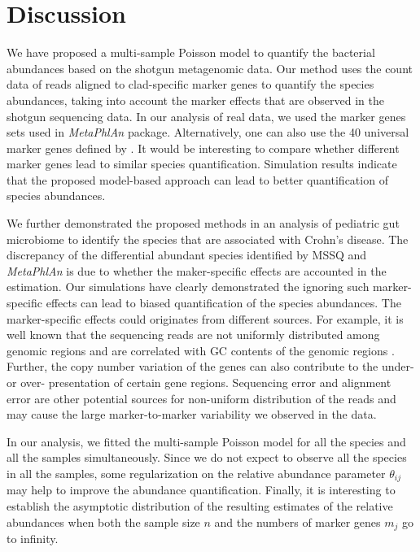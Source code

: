 \section{Discussion}
We have proposed a multi-sample Poisson model to quantify the bacterial abundances based on the shotgun metagenomic data.  Our method uses the count data of reads  aligned to clad-specific  marker genes  to quantify  the species abundances,  taking into account the marker effects that are observed in the shotgun sequencing data. In our analysis of real data, we used the marker genes sets used in  {\it MetaPhlAn} package.  Alternatively, one can also use the 40 universal marker genes defined by \cite{Sunagawa:2013if}. It would be interesting to compare whether different marker genes lead to similar species quantification. 
Simulation results indicate that the proposed model-based approach can lead to better quantification of species abundances.

We further demonstrated the proposed methods in an analysis of pediatric gut microbiome to identify the species that are associated with Crohn's disease. The discrepancy of the differential abundant species identified by MSSQ and {\it MetaPhlAn} is due to whether the maker-specific effects are accounted in the estimation. Our simulations have clearly demonstrated the ignoring such marker-specific effects can lead to biased quantification of the species abundances. The marker-specific effects could originates  from different sources. For example, it is well known that the sequencing reads are not uniformly distributed among genomic regions and are correlated with GC contents of the genomic regions \citep{ross2013characterizing}. Further, the copy number variation of the genes can also contribute to the under- or over- presentation of certain gene regions. Sequencing error and alignment error are other potential sources for non-uniform distribution of the reads and may cause the large  marker-to-marker variability we observed in the data. 

In our analysis, we fitted the multi-sample Poisson model for all the species and all the samples simultaneously. Since we do not expect to observe all the species in all the samples,  some regularization on the relative abundance parameter $\theta_{ij}$ may help to improve  the abundance quantification. Finally, it is interesting to establish the asymptotic distribution of the resulting estimates of the relative abundances when both the sample size $n$ and the numbers of marker genes $m_j$ go to infinity. 
